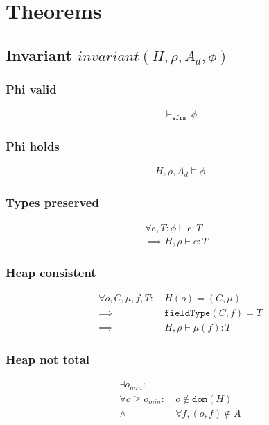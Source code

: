 \documentclass[11pt,a4paper]{article}
\newcommand{\sfrmphi}{\ensuremath{\vdash_\texttt{sfrm}}\,}
\newcommand{\evalphix}[4]{#1,#2,#3 \vDash #4}
\newcommand{\sType}[3]{{#1} \vdash {#2} : {#3}}
\newcommand{\dType}[4]{#1, #2 \vdash #3 : #4}
\begin{document}
\section{Theorems}
\subsection{Invariant $invariant(H, \rho, A_d, \phi)$}

\subsubsection{Phi valid}
\begin{align*}
    \sfrmphi {\phi}
\end{align*}

\subsubsection{Phi holds}
\begin{align*}
    \evalphix {H} {\rho} {A_d} {\phi}
\end{align*}

\subsubsection{Types preserved}
\begin{align*}
    \forall e, T : \sType {\phi} {e} {T}& \\
    \implies \dType {H} {\rho} {e} {T}&
\end{align*}

\subsubsection{Heap consistent}
\begin{align*}
\forall o, C, \mu, f, T :&~ 
H(o) = (C, \mu) \\
\implies&~ 
\texttt{fieldType}(C,f) = T \\
\implies&~
\dType {H} {\rho} {\mu(f)} {T}
\end{align*}

\subsubsection{Heap not total}
\begin{align*}
\exists o_{min} :&\\
\forall o \ge o_{min} :&~ o \not \in \texttt{dom}(H) \\
\wedge&~ \forall f, (o, f) \not \in A
\end{align*}
\end{document}
